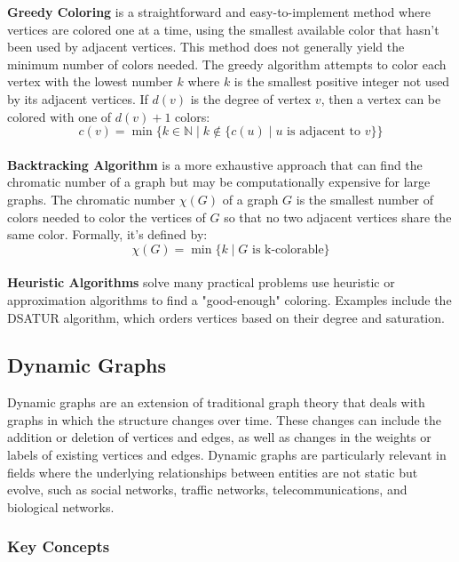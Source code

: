 \documentclass[12pt]{article}
\begin{document}
    \textbf{Greedy Coloring} is a straightforward and easy-to-implement method where
    vertices are colored one at a time, using the smallest available color that
    hasn’t been used by adjacent vertices. This method does not generally yield
    the minimum number of colors needed. The greedy algorithm attempts to color
    each vertex with the lowest number \( k \) where \( k \) is the smallest
    positive integer not used by its adjacent vertices. If \( d(v) \) is the
    degree of vertex \( v \), then a vertex can be colored with one
    of \( d(v) + 1 \) colors:
    \begin{equation}
        c(v) = \min \{ k \in \mathbb{N} \mid k \notin \{c(u) \mid u \text{ is adjacent to } v\}\}
    \end{equation}
    \\
    \textbf{Backtracking Algorithm} is a more exhaustive approach that can find the
    chromatic number of a graph but may be computationally expensive for large graphs.
    The chromatic number \( \chi(G) \) of a graph \( G \) is the smallest number
    of colors needed to color the vertices of \( G \) so that no two adjacent
    vertices share the same color. Formally, it's defined by:
    \begin{equation}
        \chi(G) = \min \{k \mid G \text{ is k-colorable} \}
    \end{equation}
    \\
    \textbf{Heuristic Algorithms} solve many practical problems use heuristic or
    approximation algorithms to find a "good-enough" coloring. Examples include
    the DSATUR algorithm, which orders vertices based on their degree and
    saturation.

    \subsection{Dynamic Graphs}

    Dynamic graphs are an extension of traditional graph theory that deals with
    graphs in which the structure changes over time. These changes can include the
    addition or deletion of vertices and edges, as well as changes in the weights
    or labels of existing vertices and edges. Dynamic graphs are particularly
    relevant in fields where the underlying relationships between entities are
    not static but evolve, such as social networks, traffic networks,
    telecommunications, and biological networks.

    \subsubsection{Key Concepts}
\end{document}
